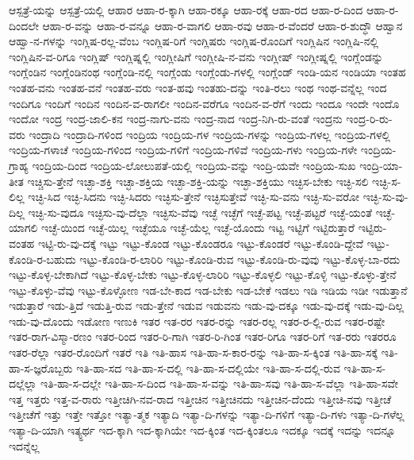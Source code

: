 {ಆಸ್ಪತ್ರೆ-ಯನ್ನು
ಆಸ್ಪತ್ರೆ-ಯಲ್ಲಿ
ಆಹಾರ
ಆಹಾ-ರ-ಕ್ಕಾಗಿ
ಆಹಾ-ರಕ್ಕೂ
ಆಹಾ-ರಕ್ಕೆ
ಆಹಾ-ರದ
ಆಹಾ-ರ-ದಿಂದ
ಆಹಾ-ರ-ದಿಂದಲೇ
ಆಹಾ-ರ-ವನ್ನು
ಆಹಾ-ರ-ವನ್ನೂ
ಆಹಾ-ರ-ವಾಗಲಿ
ಆಹಾ-ರವು
ಆಹಾ-ರ-ವೆಂದರೆ
ಆಹಾ-ರ-ಶುದ್ಧೌ
ಆಹ್ವಾನ
ಆಹ್ವಾ-ನ-ಗಳನ್ನು
ಇಂಗ್ಲಿಷ-ರಲ್ಲ-ವೆಂಬ
ಇಂಗ್ಲಿಷ-ರಿಗೆ
ಇಂಗ್ಲಿಷರು
ಇಂಗ್ಲಿಷ-ರೊಂದಿಗೆ
ಇಂಗ್ಲಿಷಿನ
ಇಂಗ್ಲಿಷಿ-ನಲ್ಲಿ
ಇಂಗ್ಲಿಷಿನ-ವ-ರಿಗೂ
ಇಂಗ್ಲಿಷ್
ಇಂಗ್ಲಿಷ್ನಲ್ಲಿ
ಇಂಗ್ಲೀಷಿಗೆ
ಇಂಗ್ಲೀಷಿ-ನ-ವನು
ಇಂಗ್ಲೀಷ್
ಇಂಗ್ಲೀಷ್ನಲ್ಲಿ
ಇಂಗ್ಲೆಂಡನ್ನು
ಇಂಗ್ಲೆಂಡಿನ
ಇಂಗ್ಲೆಂಡಿನಂಥ
ಇಂಗ್ಲೆಂಡಿ-ನಲ್ಲಿ
ಇಂಗ್ಲೆಂಡು
ಇಂಗ್ಲೆಂಡು-ಗಳಲ್ಲಿ
ಇಂಗ್ಲೆಂಡ್
ಇಂಡಿ-ಯನ
ಇಂಡಿಯಾ
ಇಂತಹ
ಇಂತಹ-ವನು
ಇಂತಹ-ವನೆ
ಇಂತಹ-ವರು
ಇಂತ-ಹವು
ಇಂತಹು-ದನ್ನು
ಇಂತಿ-ರಲು
ಇಂಥ
ಇಂಥ-ವನ್ನೆಲ್ಲ
ಇಂದ
ಇಂದಿಗೂ
ಇಂದಿಗೆ
ಇಂದಿನ
ಇಂದಿನ-ವ-ರಾಗಲೀ
ಇಂದಿನ-ವರೆಗೂ
ಇಂದಿನ-ವ-ರೆಗೆ
ಇಂದು
ಇಂದೂ
ಇಂದೇ
ಇಂದೊ
ಇಂದೋ
ಇಂದ್ರ
ಇಂದ್ರ-ಜಾಲಿ-ಕನ
ಇಂದ್ರ-ನಾಗು-ವನು
ಇಂದ್ರ-ನಾದ
ಇಂದ್ರ-ನಿಗಿ-ರು-ವಂತೆ
ಇಂದ್ರನು
ಇಂದ್ರ-ರಿ-ರು-ವರು
ಇಂದ್ರಾದಿ
ಇಂದ್ರಾದಿ-ಗಳಿಂದ
ಇಂದ್ರಿಯ
ಇಂದ್ರಿಯ-ಗಳ
ಇಂದ್ರಿಯ-ಗಳನ್ನು
ಇಂದ್ರಿಯ-ಗಳಲ್ಲ
ಇಂದ್ರಿಯ-ಗಳಲ್ಲಿ
ಇಂದ್ರಿಯ-ಗಳಾಚೆ
ಇಂದ್ರಿಯ-ಗಳಿಂದ
ಇಂದ್ರಿಯ-ಗಳಿಗೆ
ಇಂದ್ರಿಯ-ಗಳಿವೆ
ಇಂದ್ರಿಯ-ಗಳು
ಇಂದ್ರಿಯ-ಗಳೇ
ಇಂದ್ರಿಯ-ಗ್ರಾಹ್ಯ
ಇಂದ್ರಿಯ-ದಿಂದ
ಇಂದ್ರಿಯ-ಲೋಲುಪತೆ-ಯಲ್ಲಿ
ಇಂದ್ರಿಯ-ವನ್ನು
ಇಂದ್ರಿ-ಯವೇ
ಇಂದ್ರಿಯ-ಸುಖ
ಇಂದ್ರಿ-ಯಾ-ತೀತ
ಇಚ್ಚಿಸು-ತ್ತೇನೆ
ಇಚ್ಛಾ-ಶಕ್ತಿ
ಇಚ್ಛಾ-ಶಕ್ತಿಯ
ಇಚ್ಛಾ-ಶಕ್ತಿ-ಯನ್ನು
ಇಚ್ಛಾ-ಶಕ್ತಿಯು
ಇಚ್ಛಿಸ-ಬೇಕು
ಇಚ್ಛಿ-ಸಲಿ
ಇಚ್ಛಿ-ಸ-ಲಿಲ್ಲ
ಇಚ್ಛಿ-ಸಿದ
ಇಚ್ಛಿ-ಸಿದನು
ಇಚ್ಛಿ-ಸಿದರು
ಇಚ್ಛಿಸು-ತ್ತೇನೆ
ಇಚ್ಛಿಸುತ್ತೇವೆ
ಇಚ್ಛಿ-ಸು-ವನು
ಇಚ್ಛಿ-ಸು-ವರೋ
ಇಚ್ಛಿ-ಸು-ವು-ದಿಲ್ಲ
ಇಚ್ಛಿ-ಸು-ವುದೂ
ಇಚ್ಛಿಸು-ವು-ದೆಲ್ಲಾ
ಇಚ್ಛಿಸು-ವೆವು
ಇಚ್ಛೆ
ಇಚ್ಛೆಗೆ
ಇಚ್ಛೆ-ಪಟ್ಟ
ಇಚ್ಛೆ-ಪಟ್ಟರೆ
ಇಚ್ಛೆ-ಯಂತೆ
ಇಚ್ಛೆ-ಯಾಗಲಿ
ಇಚ್ಛೆ-ಯಿಂದ
ಇಚ್ಛೆ-ಯಿಲ್ಲ
ಇಚ್ಛೆಯೂ
ಇಚ್ಛೆ-ಯೆಲ್ಲ
ಇಚ್ಛೆ-ಯೊಂದು
ಇಟ್ಟ
ಇಟ್ಟಿಗೆ
ಇಟ್ಟಿರುತ್ತಾರೆ
ಇಟ್ಟಿರು-ವಂತಹ
ಇಟ್ಟಿ-ರು-ವು-ದಕ್ಕೆ
ಇಟ್ಟು
ಇಟ್ಟು-ಕೊಂಡ
ಇಟ್ಟು-ಕೊಂಡರೂ
ಇಟ್ಟು-ಕೊಂಡರೆ
ಇಟ್ಟು-ಕೊಂಡಿ-ದ್ದೇವೆ
ಇಟ್ಟು-ಕೊಂಡಿ-ರ-ಬಹುದು
ಇಟ್ಟು-ಕೊಂಡಿ-ರ-ಲಾರಿರಿ
ಇಟ್ಟು-ಕೊಂಡಿ-ರುವ
ಇಟ್ಟು-ಕೊಂಡಿ-ರು-ವುವು
ಇಟ್ಟು-ಕೊಳ್ಳ-ಬಾ-ರದು
ಇಟ್ಟು-ಕೊಳ್ಳ-ಬೇಕಾಗಿದೆ
ಇಟ್ಟು-ಕೊಳ್ಳ-ಬೇಕು
ಇಟ್ಟು-ಕೊಳ್ಳ-ಲಾರಿರಿ
ಇಟ್ಟು-ಕೊಳ್ಳಲಿ
ಇಟ್ಟು-ಕೊಳ್ಳಿ
ಇಟ್ಟು-ಕೊಳ್ಳು-ತ್ತೇನೆ
ಇಟ್ಟು-ಕೊಳ್ಳು-ವೆವು
ಇಟ್ಟು-ಕೊಳ್ಳೋಣ
ಇಡ-ಬೇ-ಕಾದ
ಇಡ-ಬೇಕು
ಇಡ-ಬೇಕೆ
ಇಡಲು
ಇಡಿ
ಇಡಿಯ
ಇಡೀ
ಇಡುತ್ತಾನೆ
ಇಡುತ್ತಾರೆ
ಇಡು-ತ್ತಿದೆ
ಇಡುತ್ತಿ-ರುವ
ಇಡು-ತ್ತೇನೆ
ಇಡುವ
ಇಡುವನು
ಇಡು-ವು-ದಕ್ಕೂ
ಇಡು-ವು-ದಕ್ಕೆ
ಇಡು-ವು-ದಿಲ್ಲ
ಇಡು-ವು-ದೊಂದು
ಇಡೋಣ
ಇಣುಕಿ
ಇತರ
ಇತ-ರರ
ಇತರ-ರನ್ನು
ಇತರ-ರಲ್ಲ
ಇತರ-ರ-ಲ್ಲಿ-ರುವ
ಇತರ-ರಷ್ಟೇ
ಇತರ-ರಾಗ-ವಿಸ್ಮಾ-ರಣಂ
ಇತರ-ರಿಂದ
ಇತರ-ರಿ-ಗಾಗಿ
ಇತರ-ರಿ-ಗಿಂತ
ಇತರ-ರಿಗೂ
ಇತರ-ರಿಗೆ
ಇತ-ರರು
ಇತರರೂ
ಇತರ-ರೆಲ್ಲಾ
ಇತರ-ರೊಂದಿಗೆ
ಇತರೆ
ಇತಿ
ಇತಿ-ಹಾಸ
ಇತಿ-ಹಾ-ಸ-ಕಾರ-ರನ್ನು
ಇತಿ-ಹಾ-ಸ-ಕ್ಕಿಂತ
ಇತಿ-ಹಾ-ಸಕ್ಕೆ
ಇತಿ-ಹಾ-ಸ-ಜ್ಞರೊಬ್ಬರು
ಇತಿ-ಹಾ-ಸದ
ಇತಿ-ಹಾ-ಸ-ದಲ್ಲಿ
ಇತಿ-ಹಾ-ಸ-ದಲ್ಲಿಯೇ
ಇತಿ-ಹಾ-ಸ-ದಲ್ಲಿ-ರುವ
ಇತಿ-ಹಾ-ಸ-ದಲ್ಲೆಲ್ಲಾ
ಇತಿ-ಹಾ-ಸ-ದಲ್ಲೇ
ಇತಿ-ಹಾ-ಸ-ದಿಂದ
ಇತಿ-ಹಾ-ಸ-ವನ್ನು
ಇತಿ-ಹಾ-ಸವು
ಇತಿ-ಹಾ-ಸ-ವೆಲ್ಲಾ
ಇತಿ-ಹಾ-ಸವೇ
ಇತ್ತ
ಇತ್ತರು
ಇತ್ತ-ವ-ರಾರು
ಇತ್ತೀಚಿಗಿ-ನವ-ರಾದ
ಇತ್ತೀಚಿನ
ಇತ್ತೀಚಿನದು
ಇತ್ತೀಚಿನ-ದೆಂದು
ಇತ್ತೀಚಿ-ನವು
ಇತ್ತೀಚೆ
ಇತ್ತೀಚೆಗೆ
ಇತ್ತು
ಇತ್ತೇ
ಇತ್ತೋ
ಇತ್ಯಾ-ತ್ಮಕ
ಇತ್ಯಾದಿ
ಇತ್ಯಾ-ದಿ-ಗಳನ್ನು
ಇತ್ಯಾ-ದಿ-ಗಳಿಗೆ
ಇತ್ಯಾ-ದಿ-ಗಳು
ಇತ್ಯಾ-ದಿ-ಗಳೆಲ್ಲ
ಇತ್ಯಾ-ದಿ-ಯಾಗಿ
ಇತ್ಯ್ಧರ್ಥ
ಇದ-ಕ್ಕಾಗಿ
ಇದ-ಕ್ಕಾಗಿಯೇ
ಇದ-ಕ್ಕಿಂತ
ಇದ-ಕ್ಕಿಂತಲೂ
ಇದಕ್ಕೂ
ಇದಕ್ಕೆ
ಇದನ್ನು
ಇದನ್ನೂ
ಇದನ್ನೆಲ್ಲ
}
